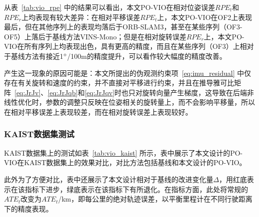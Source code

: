 从表~\ref{tab:vio_rpe} 中的结果可以看出，本文PO-VIO在相对位姿误差$RPE_t$和$RPE_r$上均表现有较大差异：在相对平移误差$RPE_t$上，本文PO-VIO在OF2上表现最后，但在其他序列上的表现均落后于ORB-SLAM3，甚至在某些序列（OF3-OF5）上落后于基线方法VINS-Mono；但是在相对旋转误差$RPE_r$上，本文PO-VIO在所有序列上均表现出色，具有更高的精度，而且在某些序列（OF3）上相对于基线方法有接近1$\degree$/100m的精度提升，可以看作较大幅度的精度改善。

产生这一现象的原因可能是：本文所提出的伪观测约束项~\eqref{eq:imu_residual} 中仅存在有关旋转和速度的约束，并不直接对平移进行约束，并且在推导雅可比矩阵~\eqref{eq:JrJv}、\eqref{eq:JrJqb}和\eqref{eq:JrJqv}时也只对旋转向量产生梯度，这导致在后端非线性优化时，参数的调整只反映在位姿相关的旋转量上，而不会影响平移量，所以在相对平移误差上表现较差，而在相对旋转误差上表现较好。

\subsubsection{KAIST数据集测试}

KAIST数据集上的测试如表~\ref{tab:vio_kaist} 所示，表中展示了本文设计的PO-VIO在KAIST数据集上的效果对比，对比方法包括基线\cite{qin2018vins}和本文设计的PO-VIO。

此外为了方便对比，表中还展示了本文设计相对于基线的改进变化量$\Delta$，用红底表示在该指标下进步，绿底表示在该指标下有所退化。在指标方面，此处将常规的$ATE_t$改变为$ATE_t$/km，即每公里的绝对轨迹误差，以平衡里程计在不同行驶距离下的精度表现。

